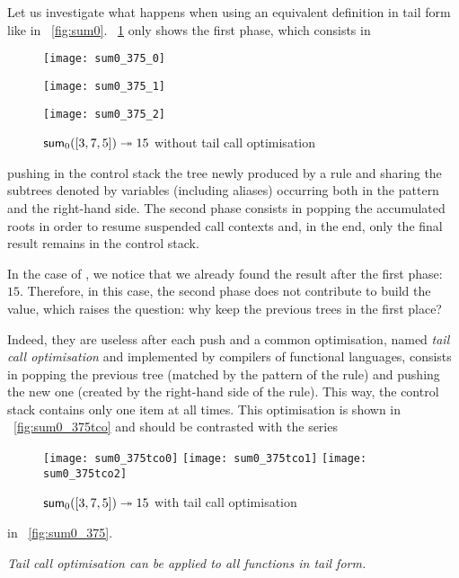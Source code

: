 Let us investigate what happens when using an equivalent definition in
tail form like  in \fig~\vref{fig:sum0}.
\Fig~\ref{fig:sum0_375} only shows the first phase, which consists in
\begin{figure}[!t]
\centering
\texttt{[image: sum0\_375\_0]}

\texttt{[image: sum0\_375\_1]}

\texttt{[image: sum0\_375\_2]}
\caption{\(\textsf{sum}_0([3,7,5]) \twoheadrightarrow 15\)
without tail call optimisation\label{fig:sum0_375}}
\end{figure}
pushing in the control stack the tree newly produced by a rule and
sharing the subtrees denoted by variables (including aliases)
occurring both in the pattern and the right\hyp{}hand side. The second
phase consists in popping the accumulated roots in order to resume
suspended call contexts and, in the end, only the final result remains
in the control stack. 

In the case of , we notice that we already found the
result after the first phase:~\(15\). Therefore, in this case, the
second phase does not contribute to build the value, which raises the
question: why keep the previous trees in the first place?

Indeed, they are useless after each push and a common optimisation,
named \emph{tail call optimisation} and implemented by compilers of
functional languages, consists in popping the previous tree (matched
by the pattern of the rule) and pushing the new one (created by the
right\hyp{}hand side of the rule). This way, the control stack
contains only one item at all times. This optimisation is shown in
\fig~\vref{fig:sum0_375tco} and should be contrasted with the series
\begin{figure}[!t]
\centering
\texttt{[image: sum0\_375tco0]}
\texttt{[image: sum0\_375tco1]}
\texttt{[image: sum0\_375tco2]}
\caption{\(\textsf{sum}_0([3,7,5]) \twoheadrightarrow 15\) with tail call
  optimisation\label{fig:sum0_375tco}}
\end{figure}
in \fig~\vref{fig:sum0_375}.

\emph{Tail call optimisation can be applied to all functions in tail
  form.}

